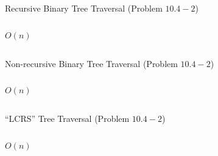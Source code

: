 
\begin{frame}{}
  \begin{exampleblock}{Recursive Binary Tree Traversal (Problem $10.4-2$)}
    \begin{columns}
	\[
	  O(n)
	\]

        \pause
	
    \end{columns}
  \end{exampleblock}
\end{frame}

\begin{frame}{}
  \begin{exampleblock}{Non-recursive Binary Tree Traversal (Problem $10.4-2$)}
    \begin{columns}
	\[
	  O(n)
	\]

        \pause
	
    \end{columns}
  \end{exampleblock}
\end{frame}

\begin{frame}{}
  \begin{exampleblock}{``LCRS'' Tree Traversal (Problem $10.4-2$)}
    \begin{columns}
	\[
	  O(n)
	\]

        \pause
	
    \end{columns}
  \end{exampleblock}
\end{frame}
